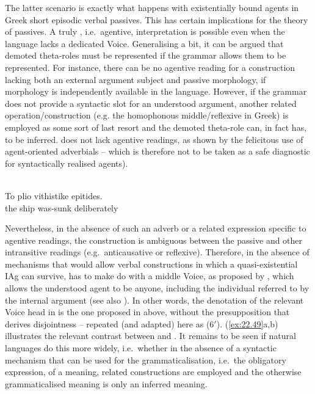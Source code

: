 \documentclass[output=paper]{langsci/langscibook}
\begin{document}
The latter scenario is exactly what happens with existentially bound agents in
Greek short episodic verbal passives. This has certain implications for the
theory of passives. A truly , i.e.\ agentive, interpretation is possible
even when the language lacks a dedicated  Voice. Generalising a bit, it
can be argued that demoted theta-roles must be represented if the grammar
allows them to be represented. For instance, there can be no agentive reading
for a construction lacking both an external argument subject and passive
morphology, if  morphology is independently available in the
language. However, if the grammar does not provide a syntactic slot for an
understood argument, another related operation/construction (e.g.  the
homophonous middle/reflexive in Greek) is employed as some sort of last resort
and the demoted theta-role can, in fact has, to be inferred.  does
not lack agentive readings, as shown by the felicitous use of agent-oriented
adverbials  -- which is therefore not to be taken as a safe
diagnostic for syntactically realised agents).

\ea%
    \label{ex:22.48}\\
    \gll    To     plio  vithistike   epitides.\\
            the ship   was-sunk   deliberately\\
\z

Nevertheless, in the absence of such an adverb or a related expression specific
to agentive readings, the  construction is ambiguous between the passive
and other intransitive readings (e.g.\ anticausative or reflexive). Therefore,
in the absence of mechanisms that would allow verbal constructions in which a
quasi-existential \gls{IAg} can survive,  has to make do with a middle Voice, as proposed by
\citet{SpathasEtAl2015}, which allows the understood agent to be anyone,
including the individual referred to by the internal argument (see also
\citealt{AlexiadouDoron2012}). In other words, the denotation of the relevant
Voice head in  is the one proposed in  above, without the
presupposition that derives disjointness – repeated (and adapted) here as (6$'$).
(\ref{ex:22.49}a,b) illustrates the relevant contrast between 
and . It remains to be seen if natural languages do this more
widely, i.e.\ whether in the absence of a syntactic mechanism that can be used
for the grammaticalisation, i.e.\ the obligatory
expression, of a meaning, related constructions are employed and the otherwise
grammaticalised meaning is only an inferred meaning.
\end{document}

